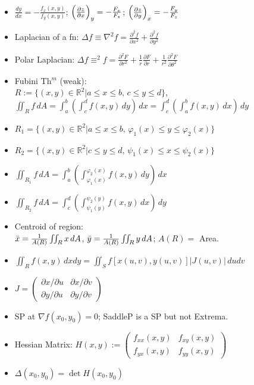 \documentclass[10pt]{article}
\begin{document}
\begin{multicols}{2}
\begin{itemize}
    \item $\frac{dy}{dx}=-\frac{f_{x}(x,y)}{f_{y}(x,y)}$; $\Big{(}\frac{\partial z}{\partial x}\Big{)}_{y}=-\frac{F_{x}}{F_{z}}$; $\Big{(}\frac{\partial z}{\partial y}\Big{)}_{x}=-\frac{F_{y}}{F_{z}}$
    \item Laplacian of a fn: $\Delta f\equiv\nabla^{2}f=\frac{\partial^{2}f}{\partial x^{2}}+\frac{\partial^{2} f}{\partial y^{2}}$
    \item Polar Laplacian: $\Delta f\equiv^{2}f=\frac{\partial^{2}F}{\partial r^{2}}+\frac{1}{r}\frac{\partial F}{\partial r}+\frac{1}{r^{2}}\frac{\partial^{2}F}{\partial\theta^{2}}$
    \item Fubini Th$^{\underline{m}}$ (weak): \\
    $R:=\{(x,y)\in\mathbb{R}^{2}|a\leq x\leq b,\,c\leq y\leq d\}$,\\
    $\iint_{R}f\,dA=\int^{b}_{a}(\int^{d}_{c}f(x,y)\,dy)\,dx=\int^{d}_{c}(\int^{b}_{a}f(x,y)\,dx)\,dy$
    \item $R_{1}=\{(x,y)\in\mathbb{R}^{2}|a\leq x\leq b,\,\varphi_{1}(x)\leq y\leq\varphi_{2}(x)\}$
    \item $R_{2}=\{(x,y)\in\mathbb{R}^{2}|c\leq y\leq d,\,\psi_{1}(x)\leq x\leq\psi_{2}(x)\}$
    \item $\iint_{R_{1}}f\,dA=\int^{b}_{a}(\int^{\varphi_{2}(x)}_{\varphi_{1}(x)}f(x,y)\,dy)\,dx$
    \item $\iint_{R_{2}}f\,dA=\int^{d}_{c}(\int^{\psi_{2}(y)}_{\psi_{1}(y)}f(x,y)\,dx)\,dy$
    \item Centroid of region: \\$\Bar{x}=\frac{1}{A(R)}\iint_{R}x\,dA$, $\Bar{y}=\frac{1}{A(R)}\iint_{R}y\,dA$; $A(R)=$ Area.
    \item $\iint_{R}f(x,y)\,dxdy=\iint_{S}f[x(u,v),y(u,v)]|J(u,v)|\,dudv$
    \item $J=\begin{pmatrix}\partial x/\partial u &\partial x/\partial v\\\partial y/\partial u & \partial y/\partial v\end{pmatrix}$
    \item SP at $\nabla f(x_{0},y_{0})=0$; SaddleP is a SP but not Extrema.
    \item Hessian Matrix: $H(x,y):=\begin{pmatrix}f_{xx}(x,y) &f_{xy}(x,y)\\f_{yx}(x,y) &f_{yy}(x,y)\end{pmatrix}$
    \item $\Delta(x_{0},y_{0})=\det H(x_{0},y_{0})$

\end{itemize}
\end{multicols}
\end{document}
